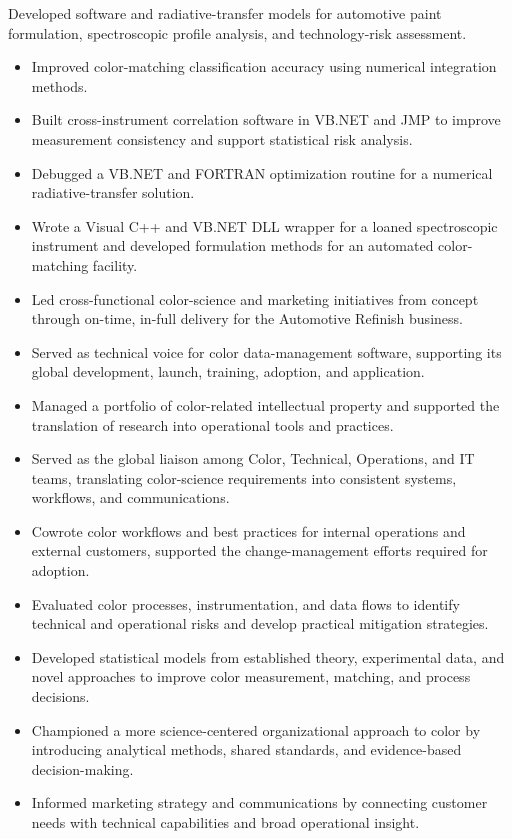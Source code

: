Developed software and radiative-transfer models for automotive paint formulation, spectroscopic profile analysis, and technology-risk assessment.
\begin{itemize}
  \item Improved color-matching classification accuracy using numerical integration methods.
  \item Built cross-instrument correlation software in VB.NET and JMP to improve measurement consistency and support statistical risk analysis.
  \item Debugged a VB.NET and FORTRAN optimization routine for a numerical radiative-transfer solution.
  \item Wrote a Visual C++ and VB.NET DLL wrapper for a loaned spectroscopic instrument and developed formulation methods for an automated color-matching facility.
  \item Led cross-functional color-science and marketing initiatives from concept through on-time, in-full delivery for the Automotive Refinish business.
  \item Served as technical voice for color data-management software, supporting its global development, launch, training, adoption, and application.
  \item Managed a portfolio of color-related intellectual property and supported the translation of research into operational tools and practices.
  \item Served as the global liaison among Color, Technical, Operations, and IT teams, translating color-science requirements into consistent systems, workflows, and communications.
  \item Cowrote color workflows and best practices for internal operations and external customers, supported the change-management efforts required for adoption.
  \item Evaluated color processes, instrumentation, and data flows to identify technical and operational risks and develop practical mitigation strategies.
  \item Developed statistical models from established theory, experimental data, and novel approaches to improve color measurement, matching, and process decisions.
  \item Championed a more science-centered organizational approach to color by introducing analytical methods, shared standards, and evidence-based decision-making.
  \item Informed marketing strategy and communications by connecting customer needs with technical capabilities and broad operational insight.
\end{itemize}
